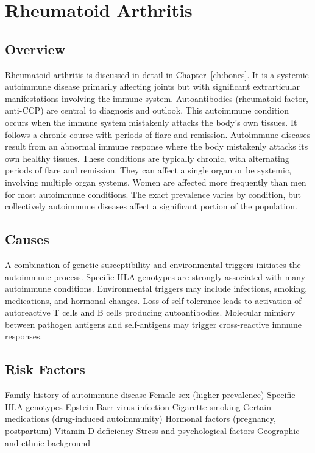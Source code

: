 \chapter{Rheumatoid Arthritis}
\label{sec:Rheumatoid Arthritis (Immune)}

\section{Overview}
Rheumatoid arthritis is discussed in detail in Chapter~\ref{ch:bones}. It is a systemic autoimmune disease primarily affecting joints but with significant extrarticular manifestations involving the immune system. Autoantibodies (rheumatoid factor, anti-CCP) are central to diagnosis and outlook. This autoimmune condition occurs when the immune system mistakenly attacks the body's own tissues. It follows a chronic course with periods of flare and remission. Autoimmune diseases result from an abnormal immune response where the body mistakenly attacks its own healthy tissues. These conditions are typically chronic, with alternating periods of flare and remission. They can affect a single organ or be systemic, involving multiple organ systems. Women are affected more frequently than men for most autoimmune conditions. The exact prevalence varies by condition, but collectively autoimmune diseases affect a significant portion of the population.
\section{Causes}
A combination of genetic susceptibility and environmental triggers initiates the autoimmune process. Specific HLA genotypes are strongly associated with many autoimmune conditions. Environmental triggers may include infections, smoking, medications, and hormonal changes. Loss of self-tolerance leads to activation of autoreactive T cells and B cells producing autoantibodies. Molecular mimicry between pathogen antigens and self-antigens may trigger cross-reactive immune responses.
\section{Risk Factors}
Family history of autoimmune disease Female sex (higher prevalence) Specific HLA genotypes Epstein-Barr virus infection Cigarette smoking Certain medications (drug-induced autoimmunity) Hormonal factors (pregnancy, postpartum) Vitamin D deficiency Stress and psychological factors Geographic and ethnic background

